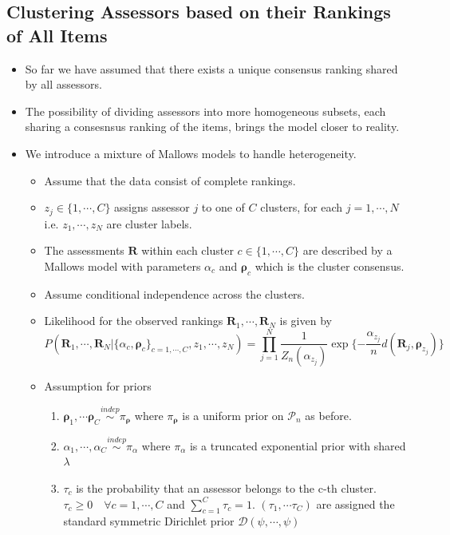 \documentclass[12pt]{article}
\begin{document}
\subsection{Clustering Assessors based on their Rankings of All Items}
\begin{itemize}
    \item So far we have assumed that there exists a unique consensus ranking shared by all assessors. 
    \item The possibility of dividing assessors into more homogeneous subsets, each sharing a consesnsus ranking of the items, brings the model closer to reality. 
    \item We introduce a mixture of Mallows models to handle heterogeneity.
    \begin{itemize}
        \item Assume that the data consist of complete rankings.
        \item $z_j\in \{1,\cdots, C\}$ assigns assessor $j$ to one of $C$ clusters, for each $j=1,\cdots, N$ \\ i.e. $z_1, \cdots, z_N$ are cluster labels.
        \item The assessments $\mathbf{R}$ within each cluster $c\in\{1,\cdots, C\}$ are described by a Mallows model with parameters $\alpha_c$ and $\boldsymbol{\rho}_c$ which is the cluster consensus. 
        \item Assume conditional independence across the clusters.
        \item Likelihood for the observed rankings $\mathbf{R}_1, \cdots, \mathbf{R}_N$ is given by \begin{equation*}
            P(\mathbf{R}_1, \cdots, \mathbf{R}_N|\{\alpha_c, \boldsymbol{\rho}_c\}_{c=1,\cdots, C}, z_1, \cdots, z_N)= \prod_{j=1}^N \frac{1}{Z_n(\alpha_{z_j})}\exp\{-\frac{\alpha_{z_j}}{n} d(\mathbf{R}_j, \boldsymbol{\rho}_{z_j})\}
        \end{equation*}
        \item Assumption for priors
        \begin{enumerate}
            \item $\boldsymbol{\rho}_1, \cdots \boldsymbol{\rho}_C \overset{indep}{\sim} \pi_{\boldsymbol{\rho}}$ where $\pi_{\boldsymbol{\rho}}$ is a uniform prior on $\mathcal{P}_n$ as before.
            \item $\alpha_1, \cdots, \alpha_C \overset{indep}{\sim} \pi_\alpha$ where $\pi_\alpha$ is a truncated exponential prior with shared $\lambda$
            \item $\tau_c$ is the probability that an assessor belongs to the c-th cluster. \\ $\tau_c\geq 0 \quad \forall c=1,\cdots, C$ and $\sum_{c=1}^C \tau_c=1$. \; $(\tau_1, \cdots \tau_C)$ are assigned the standard symmetric Dirichlet prior $\mathcal{D}(\psi, \cdots, \psi)$

\end{enumerate}
\end{itemize}
\end{itemize}
\end{document}
